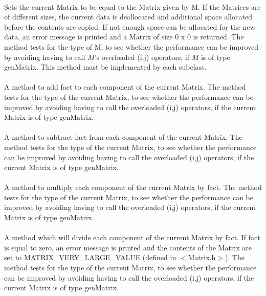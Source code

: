 \\
Sets the current Matrix to be equal to the Matrix given by \p M. If
the Matrices are of different sizes, the current data is deallocated
and additional space allocated before the contents are copied. If not
enough space can be allocated for the new data, an error message is
printed and a Matrix of size $0$ x $0$ is returned. The method tests
for the type of \p M, to see whether the performance can be
improved by avoiding having to call $M$'s overloaded (i,j) operators,
if $M$ is of type genMatrix. This method must be implemented by each
subclass. \\ 

 \\
A method to add \p fact to each component of the current Matrix. 
The method tests for the type of the current Matrix, to see whether
the performance can be improved by avoiding having to call the
overloaded (i,j) operators, if the current Matrix is of type
genMatrix. \\ 

 \\
A method to subtract \p fact from each component of the current Matrix. 
The method tests for the type of the current Matrix, to see whether
the performance can be improved by avoiding having to call the
overloaded (i,j) operators, if the current Matrix is of type
genMatrix. \\ 

 \\
A method to multiply each component of the current Matrix by \p fact. 
The method tests for the type of the current Matrix, to see whether
the performance can be improved by avoiding having to call the
overloaded (i,j) operators, if the current Matrix is of type
genMatrix. \\ 

 \\
A method which will divide each component of the current Matrix
by \p fact. If \p fact is equal to zero, an error message is
printed and the contents of the Matrix are set to
MATRIX\_VERY\_LARGE\_VALUE (defined in $<$Matrix.h$>$). The method
tests for the type of the current Matrix, to see whether the
performance can be improved by avoiding having to call the overloaded
(i,j) operators, if the current Matrix is of type genMatrix. \\ 

